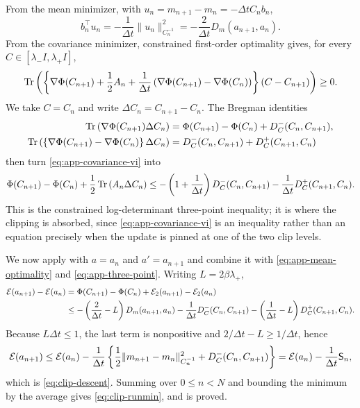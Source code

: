 From the mean minimizer, with $u_n = m_{n+1} - m_n = -\Delta t C_n b_n$,
\begin{equation}\label{eq:app-mean-optimality}
    b_n^\top u_n = -\frac{1}{\Delta t} \| u_n \|_{C_n^{-1}}^2 = -\frac{2}{\Delta t} D_m (a_{n+1}, a_n).
\end{equation}
From the covariance minimizer, constrained first-order optimality gives, for every $C \in [\lambda_- I, \lambda_+ I]$,
\begin{equation}\label{eq:app-covariance-vi}
    \operatorname{Tr} \left( \left\{ \nabla \Phi (C_{n+1}) + \frac{1}{2} A_n + \frac{1}{\Delta t} \left( \nabla \Phi (C_{n+1}) - \nabla \Phi (C_n) \right) \right\} (C - C_{n+1}) \right) \geq 0.
\end{equation}
We take $C = C_n$ and write $\Delta C_n = C_{n+1} - C_n$. The Bregman identities
\begin{align*}
    \operatorname{Tr} \left( \nabla \Phi (C_{n+1}) \Delta C_n \right) &= \Phi (C_{n+1}) - \Phi (C_n) + D_C^- (C_n, C_{n+1}), \\
    \operatorname{Tr} \left( \left\{ \nabla \Phi (C_{n+1}) - \nabla \Phi (C_n) \right\} \Delta C_n \right) &= D_C^- (C_n, C_{n+1}) + D_C^+ (C_{n+1}, C_n)
\end{align*}
then turn \eqref{eq:app-covariance-vi} into
\begin{equation}\label{eq:app-three-point}
    \Phi (C_{n+1}) - \Phi (C_n) + \frac{1}{2} \operatorname{Tr} \left( A_n \Delta C_n \right) \leq - \left( 1 + \frac{1}{\Delta t} \right) D_C^- (C_n, C_{n+1}) - \frac{1}{\Delta t} D_C^+ (C_{n+1}, C_n).
\end{equation}
This is the constrained log-determinant three-point inequality; it is where the clipping is absorbed, since \eqref{eq:app-covariance-vi} is an inequality rather than an equation precisely when the update is pinned at one of the two clip levels.

We now apply  with $a = a_n$ and $a' = a_{n+1}$ and combine it with \eqref{eq:app-mean-optimality} and \eqref{eq:app-three-point}. Writing $L = 2\beta\lambda_+$,
\begin{align*}
    \mathcal{E} (a_{n+1}) - \mathcal{E} (a_n) &= \Phi (C_{n+1}) - \Phi (C_n) + \mathcal{E}_2 (a_{n+1}) - \mathcal{E}_2 (a_n) \\
    &\leq - \left( \frac{2}{\Delta t} - L \right) D_m (a_{n+1}, a_n) - \frac{1}{\Delta t} D_C^- (C_n, C_{n+1}) - \left( \frac{1}{\Delta t} - L \right) D_C^+ (C_{n+1}, C_n).
\end{align*}
Because $L \Delta t \leq 1$, the last term is nonpositive and $2 / \Delta t - L \geq 1 / \Delta t$, hence
\begin{equation*}
    \mathcal{E} (a_{n+1}) \leq \mathcal{E} (a_n) - \frac{1}{\Delta t} \left\{ \frac{1}{2} \| m_{n+1} - m_n \|_{C_n^{-1}}^2 + D_C^- (C_n, C_{n+1}) \right\} = \mathcal{E} (a_n) - \frac{1}{\Delta t} \mathsf{S}_n,
\end{equation*}
which is \eqref{eq:clip-descent}. Summing over $0 \leq n < N$ and bounding the minimum by the average gives \eqref{eq:clip-runmin}, and  is proved.

